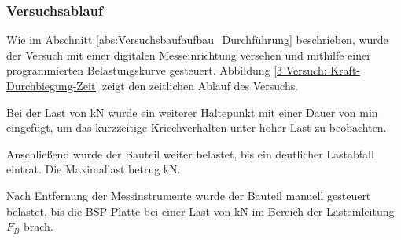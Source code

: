 \subsubsection{Versuchsablauf}


Wie im Abschnitt \ref{abs:Versuchsbaufaufbau_Durchführung} beschrieben, wurde der Versuch mit einer digitalen Messeinrichtung versehen und mithilfe einer programmierten Belastungskurve gesteuert. Abbildung \ref{3 Versuch: Kraft-Durchbiegung-Zeit} zeigt den zeitlichen Ablauf des Versuchs. 

Bei der Last von \unit[35]{kN} wurde ein weiterer Haltepunkt mit einer Dauer von \unit[30]{min} eingefügt, um das kurzzeitige Kriechverhalten  unter hoher Last zu beobachten.

Anschließend wurde der Bauteil weiter belastet, bis ein deutlicher Lastabfall eintrat. Die Maximallast betrug \unit[58]{kN}.

Nach Entfernung der Messinstrumente wurde der Bauteil manuell gesteuert belastet, bis die BSP-Platte bei einer Last von \unit[35]{kN} im Bereich der Lasteinleitung $F_B$ brach.

 



 

